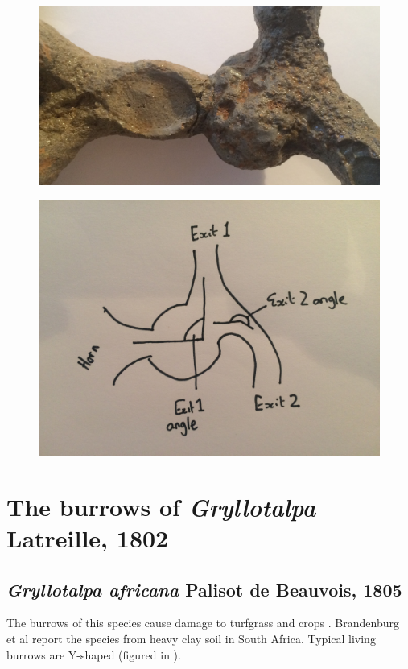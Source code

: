 \documentclass{article}
\begin{document}
   \begin{figure}[h]
   	\includegraphics[width=\textwidth]{acoustic_two_exit}
   	\caption{}
   	\label{fig:acoustic_two_exit}
   \end{figure}
   
   \begin{figure}[h]
   	\includegraphics[width=\textwidth]{acoustic_exit_angle}
   	\caption{}
   	\label{fig:acoustic_exit_angle}
   \end{figure}
   
   \section{The burrows of \textit{Gryllotalpa} Latreille, 1802}
   
   \subsection{\textit{Gryllotalpa africana} Palisot de Beauvois, 1805 \cite{palisot1805}}
   The burrows of this species cause damage to turfgrass and crops \cite{brandenburg2002}. Brandenburg et al \cite{brandenburg2002} report the species from heavy clay soil in South Africa. Typical living burrows are Y-shaped (figured in \cite{brandenburg2002}).
   
\end{document}
